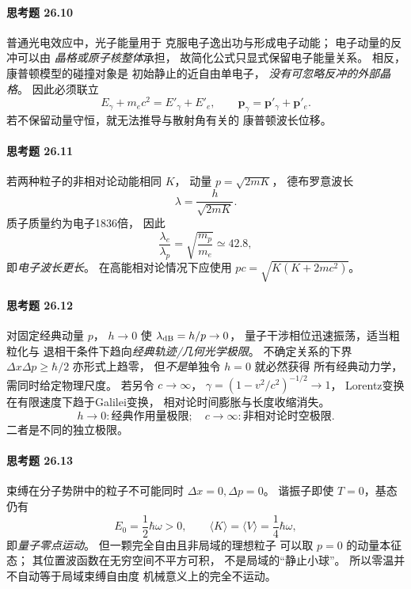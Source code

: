 \paragraph{思考题 26.10}
普通光电效应中，光子能量用于
克服电子逸出功与形成电子动能；
电子动量的反冲可以由
\emph{晶格或原子核整体}承担，
故简化公式只显式保留电子能量关系。
相反，康普顿模型的碰撞对象是
初始静止的近自由单电子，
\emph{没有可忽略反冲的外部晶格}。
因此必须联立
\[
\boxed{E_\gamma+m_ec^2
=E'_\gamma+E'_e},\qquad
\boxed{\boldsymbol p_\gamma
=\boldsymbol p'_\gamma+\boldsymbol p'_e}.
\]
若不保留动量守恒，就无法推导与散射角有关的
康普顿波长位移。

\paragraph{思考题 26.11}
若两种粒子的非相对论动能相同 \(K\)，
动量 \(p=\sqrt{2mK}\)，
德布罗意波长
\[
\boxed{\lambda=\frac{h}{\sqrt{2mK}}}.
\]
质子质量约为电子1836倍，
因此
\[
\boxed{\frac{\lambda_e}{\lambda_p}
=\sqrt{\frac{m_p}{m_e}}\simeq42.8},
\]
即\emph{电子波长更长}。
在高能相对论情况下应使用
\(p c=\sqrt{K(K+2mc^2)}\)。

\paragraph{思考题 26.12}
对固定经典动量 \(p\)，
\(h\to0\) 使
\(\lambda_{\rm dB}=h/p\to0\)，
量子干涉相位迅速振荡，适当粗粒化与
退相干条件下趋向\emph{经典轨迹/几何光学极限}。
不确定关系的下界
\(\Delta x\Delta p\ge\hbar/2\) 亦形式上趋零，
但\emph{不是}单独令 \(h=0\) 就必然获得
所有经典动力学，需同时给定物理尺度。
若另令 \(c\to\infty\)，
\(\gamma=(1-v^2/c^2)^{-1/2}\to1\)，
Lorentz变换在有限速度下趋于Galilei变换，
相对论时间膨胀与长度收缩消失。
\[
\boxed{h\to0:\text{经典作用量极限};
\quad c\to\infty:\text{非相对论时空极限}}.
\]
二者是不同的独立极限。

\paragraph{思考题 26.13}
束缚在分子势阱中的粒子不可能同时
\(\Delta x=0,\Delta p=0\)。
谐振子即使 \(T=0\)，基态仍有
\[
\boxed{E_0=\frac12\hbar\omega>0},
\qquad
\boxed{\langle K\rangle=\langle V\rangle
=\frac14\hbar\omega},
\]
即\emph{量子零点运动}。
但一颗完全自由且非局域的理想粒子
可以取 \(p=0\) 的动量本征态；
其位置波函数在无穷空间不平方可积，
不是局域的“静止小球”。
所以零温并不自动等于局域束缚自由度
机械意义上的完全不运动。
